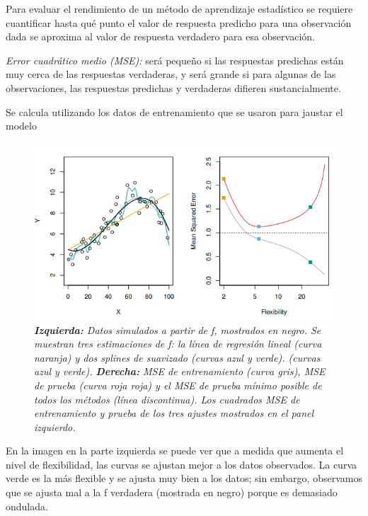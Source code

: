 \documentclass[
  letterpaper,
  DIV=11,
  numbers=noendperiod]{scrartcl}
\begin{document}
Para evaluar el rendimiento de un método de aprendizaje estadístico se
requiere cuantificar hasta qué punto el valor de respuesta predicho para
una observación dada se aproxima al valor de respuesta verdadero para
esa observación.

\emph{Error cuadrático medio (MSE):} será pequeño si las respuestas
predichas están muy cerca de las respuestas verdaderas, y será grande si
para algunas de las observaciones, las respuestas predichas y verdaderas
difieren sustancialmente.

Se calcula utilizando los datos de entrenamiento que se usaron para
jaustar el modelo

\begin{figure}

{\centering \includegraphics[width=5.01042in,height=\textheight]{images/MSE.png}

}

\caption{\emph{\textbf{Izquierda:} Datos simulados a partir de f,
mostrados en negro. Se muestran tres estimaciones de f: la línea de
regresión lineal (curva naranja) y dos splines de suavizado (curvas azul
y verde). (curvas azul y verde). \textbf{Derecha:} MSE de entrenamiento
(curva gris), MSE de prueba (curva roja roja) y el MSE de prueba mínimo
posible de todos los métodos (línea discontinua). Los cuadrados MSE de
entrenamiento y prueba de los tres ajustes mostrados en el panel
izquierdo.}}

\end{figure}

En la imagen en la parte izquierda se puede ver que a medida que aumenta
el nivel de flexibilidad, las curvas se ajustan mejor a los datos
observados. La curva verde es la más flexible y se ajusta muy bien a los
datos; sin embargo, observamos que se ajusta mal a la f verdadera
(mostrada en negro) porque es demasiado ondulada.
\end{document}
